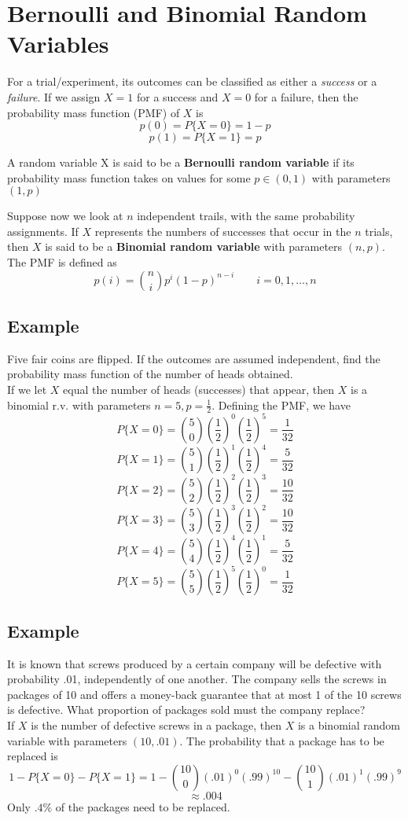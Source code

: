 \section{Bernoulli and Binomial Random Variables}
For a trial/experiment, its outcomes can be classified as either a \textit{success} or a \textit{failure}. If we assign $X=1$ for a success and $X = 0$ for a failure, then the probability mass function (PMF) of $X$ is
\[p(0) = P\{X = 0\} = 1 - p\] \[p(1) = P\{X = 1\} = p\]
\begin{definition}
    A random variable X is said to be a \textbf{Bernoulli random variable} if its probability mass function takes on values for some $p\in(0,1)$ with parameters $(1,p)$
\end{definition}
\begin{definition}
    Suppose now we look at $n$ independent trails, with the same probability assignments. If $X$ represents the numbers of successes that occur in the $n$ trials, then $X$ is said to be a \textbf{Binomial random variable} with parameters $(n,p)$. The PMF is defined as \[p(i) = {n\choose i}p^i(1-p)^{n-i}\qquad i = 0,1,\dots, n\]
\end{definition}
\subsection*{Example}
Five fair coins are flipped. If the outcomes are assumed independent, find the probability mass function of the number of heads obtained.\\

If we let $X$ equal the number of heads (successes) that appear, then $X$ is a binomial r.v. with parameters $n = 5, p = \frac{1}{2}$. Defining the PMF, we have
\[P\{X = 0\} = {5\choose 0}\left(\frac{1}{2}\right)^0\left(\frac{1}{2}\right)^5 = \frac{1}{32}\]
\[P\{X = 1\} = {5\choose 1}\left(\frac{1}{2}\right)^1\left(\frac{1}{2}\right)^4 = \frac{5}{32}\]
\[P\{X = 2\} = {5\choose 2}\left(\frac{1}{2}\right)^2\left(\frac{1}{2}\right)^3 = \frac{10}{32}\]
\[P\{X = 3\} = {5\choose 3}\left(\frac{1}{2}\right)^3\left(\frac{1}{2}\right)^2 = \frac{10}{32}\]
\[P\{X = 4\} = {5\choose 4}\left(\frac{1}{2}\right)^4\left(\frac{1}{2}\right)^1 = \frac{5}{32}\]
\[P\{X = 5\} = {5\choose 5}\left(\frac{1}{2}\right)^5\left(\frac{1}{2}\right)^0 = \frac{1}{32}\]

\subsection*{Example}
It is known that screws produced by a certain company will be defective with probability .01, independently of one another. The company sells the screws in packages of 10 and offers a money-back guarantee that at most 1 of the 10
screws is defective. What proportion of packages sold must the company replace?\\
If $X$ is the number of defective screws in a package, then $X$ is a binomial random variable with parameters $(10, .01)$. The probability that a package has to be replaced is
\[1 - P\{X = 0\} - P\{X = 1\} = 1 - {10\choose 0}(.01)^0(.99)^10 - {10\choose 1}(.01)^1(.99)^9\]
\[\approx .004\]
Only $.4\%$ of the packages need to be replaced. 
